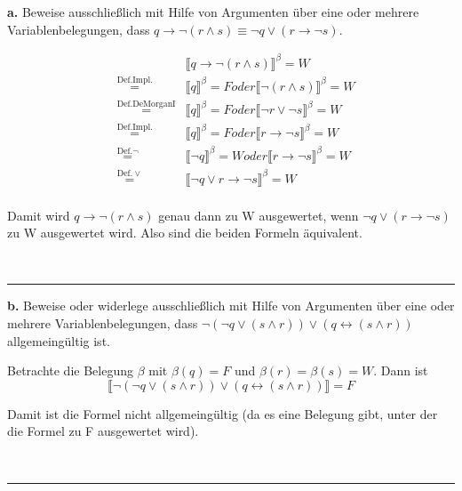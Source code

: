 \documentclass[10pt,leqno ]{article}
\newcommand\customeq[1]{\overset{\mathrm{#1}}{=}}
\theoremstyle{definition}
\newenvironment{solution}[1][L]{\begin{doublespace}\textbf{#1.}\quad }{\ \rule{0.5em}{0.5em}\end{doublespace}}
\begin{document}
\begin{solution}[a]
Beweise ausschließlich mit Hilfe von Argumenten über eine oder mehrere Variablenbelegungen, dass \( q \rightarrow \lnot (r \land s) \equiv \lnot q \lor (r \rightarrow \lnot s) \).

\begin{equation*}
    \begin{aligned}
    & & \llbracket q \rightarrow \lnot (r \land s) \rrbracket ^ \beta = W \\
    & \customeq{Def. Impl.} & \llbracket q \rrbracket ^ \beta = F oder \llbracket \lnot (r \land s) \rrbracket ^ \beta = W  \\
    & \customeq{Def. De Morgan I} & \llbracket q \rrbracket ^ \beta = F oder \llbracket \lnot r \lor \lnot s \rrbracket ^ \beta = W  \\
    & \customeq{Def. Impl.} & \llbracket q \rrbracket ^ \beta = F oder \llbracket r \rightarrow \lnot s \rrbracket ^ \beta = W  \\
    & \customeq{Def. \lnot} & \llbracket \lnot q \rrbracket ^ \beta = W oder \llbracket r \rightarrow \lnot s \rrbracket ^ \beta = W  \\
    & \customeq{Def. \lor} & \llbracket \lnot q \lor r \rightarrow \lnot s \rrbracket ^ \beta = W  \\
    \end{aligned}
\end{equation*}

Damit wird \( q \rightarrow \lnot (r \land s) \) genau dann zu W ausgewertet, wenn \( \lnot q \lor (r \rightarrow \lnot s) \) zu W ausgewertet wird.
Also sind die beiden Formeln äquivalent.

\end{solution}
    
\begin{solution}[b]
Beweise oder widerlege ausschließlich mit Hilfe von Argumenten über eine oder mehrere Variablenbelegungen, dass \( \lnot (\lnot q \lor (s \land r)) \lor (q \leftrightarrow (s \land r)) \) allgemeingültig ist.

Betrachte die Belegung \( \beta \) mit \( \beta (q) = F \) und \( \beta (r) = \beta (s) = W \). Dann ist
\[ \llbracket \lnot (\lnot q \lor (s \land r)) \lor (q \leftrightarrow (s \land r)) \rrbracket = F \]

Damit ist die Formel nicht allgemeingültig (da es eine Belegung gibt, unter der die Formel zu F ausgewertet wird).

\end{solution}
    
\end{document}
